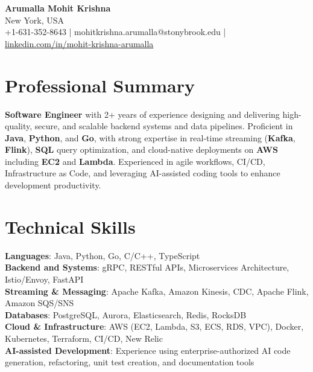 \documentclass[letterpaper,11pt]{article}
\begin{document}
\begin{center}
  {\Large \textbf{Arumalla Mohit Krishna}} \\
  New York, USA \\
  +1-631-352-8643 \enspace | \enspace mohitkrishna.arumalla@stonybrook.edu \enspace | \enspace \href{https://www.linkedin.com/in/mohit-krishna-arumalla}{linkedin.com/in/mohit-krishna-arumalla}
\end{center}

\section{Professional Summary}
  \begin{itemize}[leftmargin=0.15in, label={}]
    \small{\item{
    \textbf{Software Engineer} with 2+ years of experience designing and delivering high-quality, secure, and scalable backend systems and data pipelines. Proficient in \textbf{Java}, \textbf{Python}, and \textbf{Go}, with strong expertise in real-time streaming (\textbf{Kafka}, \textbf{Flink}), \textbf{SQL} query optimization, and cloud-native deployments on \textbf{AWS} including \textbf{EC2} and \textbf{Lambda}. Experienced in agile workflows, CI/CD, Infrastructure as Code, and leveraging AI-assisted coding tools to enhance development productivity.
    }}
  \end{itemize}
\vspace{-16pt}

\section{Technical Skills}
 \begin{itemize}[leftmargin=0.15in, label={}]
    \small{\item{
     \textbf{Languages}: Java, Python, Go, C/C++, TypeScript \\
     \textbf{Backend and Systems}: gRPC, RESTful APIs, Microservices Architecture, Istio/Envoy, FastAPI \\
     \textbf{Streaming \& Messaging}: Apache Kafka, Amazon Kinesis, CDC, Apache Flink, Amazon SQS/SNS \\
     \textbf{Databases}: PostgreSQL, Aurora, Elasticsearch, Redis, RocksDB \\
     \textbf{Cloud \& Infrastructure}: AWS (EC2, Lambda, S3, ECS, RDS, VPC), Docker, Kubernetes, Terraform, CI/CD, New Relic \\
     \textbf{AI-assisted Development}: Experience using enterprise-authorized AI code generation, refactoring, unit test creation, and documentation tools \\
    }}
 \end{itemize}
\vspace{-16pt}
\end{document}
